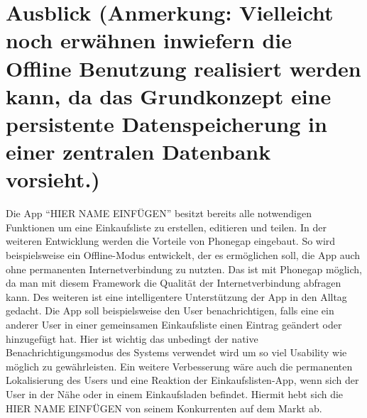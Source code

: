\documentclass[10pt, conference, compsocconf]{IEEEtran}
\begin{document}
{\section {Ausblick (Anmerkung: Vielleicht noch erw\"ahnen inwiefern die Offline Benutzung realisiert werden kann, da das Grundkonzept eine persistente Datenspeicherung in einer zentralen Datenbank vorsieht.)}
Die App “HIER NAME EINF\"UGEN” besitzt bereits alle notwendigen Funktionen um eine Einkaufsliste zu erstellen, editieren und teilen. In der weiteren Entwicklung werden die Vorteile von Phonegap eingebaut. So wird beispielsweise ein Offline-Modus entwickelt, der es erm\"oglichen soll, die App auch ohne permanenten Internetverbindung zu nutzten. Das ist mit Phonegap m\"oglich, da man mit diesem Framework die Qualit\"at der Internetverbindung abfragen kann. Des weiteren ist eine intelligentere Unterst\"utzung der App in den Alltag gedacht. Die App soll beispielsweise den User benachrichtigen, falls eine ein anderer User in einer gemeinsamen Einkaufsliste einen Eintrag ge\"andert oder hinzugef\"ugt hat. Hier ist wichtig das unbedingt der native Benachrichtigungsmodus des Systems verwendet wird um so viel Usability wie m\"oglich zu gew\"ahrleisten. Ein weitere Verbesserung w\"are auch die permanenten Lokalisierung des Users und eine Reaktion der Einkaufslisten-App, wenn sich der User in der N\"ahe oder in einem Einkaufsladen befindet. Hiermit hebt sich die HIER NAME EINF\"UGEN von seinem Konkurrenten auf dem Markt ab.



%
%

}
\end{document}
